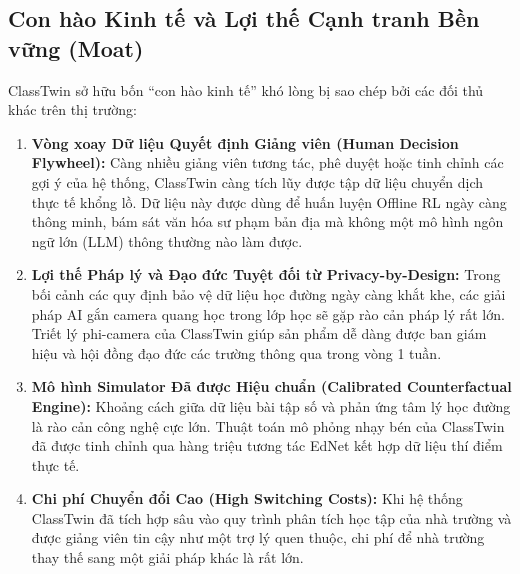 \subsection{Con hào Kinh tế và Lợi thế Cạnh tranh Bền vững (Moat)}\label{subsec:moat}
ClassTwin sở hữu bốn ``con hào kinh tế'' khó lòng bị sao chép bởi các đối thủ khác trên thị trường:
\begin{enumerate}
  \item \textbf{Vòng xoay Dữ liệu Quyết định Giảng viên (Human Decision Flywheel):} Càng nhiều giảng viên tương tác, phê duyệt hoặc tinh chỉnh các gợi ý của hệ thống, ClassTwin càng tích lũy được tập dữ liệu chuyển dịch thực tế khổng lồ. Dữ liệu này được dùng để huấn luyện Offline RL ngày càng thông minh, bám sát văn hóa sư phạm bản địa mà không một mô hình ngôn ngữ lớn (LLM) thông thường nào làm được.
  \item \textbf{Lợi thế Pháp lý và Đạo đức Tuyệt đối từ Privacy-by-Design:} Trong bối cảnh các quy định bảo vệ dữ liệu học đường ngày càng khắt khe, các giải pháp AI gắn camera quang học trong lớp học sẽ gặp rào cản pháp lý rất lớn. Triết lý phi-camera của ClassTwin giúp sản phẩm dễ dàng được ban giám hiệu và hội đồng đạo đức các trường thông qua trong vòng 1 tuần.
  \item \textbf{Mô hình Simulator Đã được Hiệu chuẩn (Calibrated Counterfactual Engine):} Khoảng cách giữa dữ liệu bài tập số và phản ứng tâm lý học đường là rào cản công nghệ cực lớn. Thuật toán mô phỏng nhạy bén của ClassTwin đã được tinh chỉnh qua hàng triệu tương tác EdNet kết hợp dữ liệu thí điểm thực tế.
  \item \textbf{Chi phí Chuyển đổi Cao (High Switching Costs):} Khi hệ thống ClassTwin đã tích hợp sâu vào quy trình phân tích học tập của nhà trường và được giảng viên tin cậy như một trợ lý quen thuộc, chi phí để nhà trường thay thế sang một giải pháp khác là rất lớn.
\end{enumerate}

\newpage

